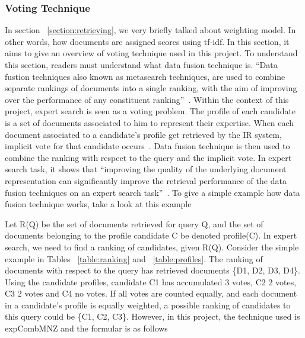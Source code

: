 \subsubsection{Voting Technique}\label{section:voting}
In section ~\ref{section:retrieving}, we very briefly talked about weighting model. In other words, how documents are assigned scores using tf-idf. In this section,
it aims to give an overview of voting technique used in this project. To understand this section, readers must understand what data fusion technique is. 
``Data fustion techniques also known as metasearch techniques, are used to combine separate rankings of documents into a single ranking,
with the aim of improving over the performance of any constituent ranking''~\cite[P. 388]{expertsearch}. Within the context of this project, 
expert search is seen as a voting problem. The profile of each candidate is a set of documents associated to him to represent their expertise.
When each document associated to a candidate's profile get retrieved by the IR system, implicit vote for that candidate occurs~\cite[P. 389]{expertsearch}.
Data fusion technique is then used to combine the ranking with respect to the query and the implicit vote. In expert search task, it shows that 
``improving the quality of the underlying document representation can significantly improve the retrieval performance of the data fusion techniques 
on an expert search task''~\cite[P. 387]{expertsearch}. To give a simple example how data fusion technique works, take a look at this example

Let R(Q) be the set of documents retrieved for query Q, and the set of documents belonging to the profile candidate C be denoted profile(C). In expert
search, we need to find a ranking of candidates, given R(Q). Consider the simple example in Tables ~\ref{table:ranking} and ~\ref{table:profiles}.
The ranking of documents with respect to the query has retrieved documents \{D1, D2, D3, D4\}. Using the candidate profiles, candidate C1 has accumulated
3 votes, C2 2 votes, C3 2 votes and C4 no votes. If all votes are counted equally, and each document in a candidate's profile is equally weighted, a possible
ranking of candidates to this query could be \{C1, C2, C3\}. However, in this project, the technique used is expCombMNZ and the formular is as follows

